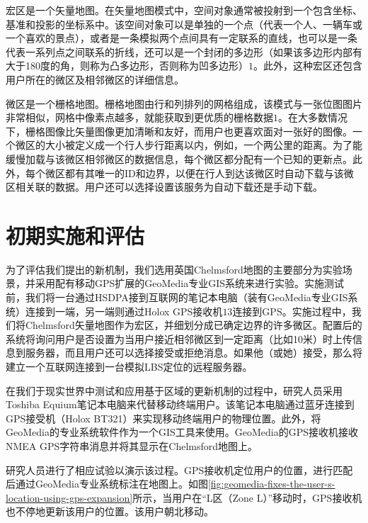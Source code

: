 \documentclass{article}
\begin{document}
\begin{CJK}{UTF8}{gbsn}
	宏区是一个矢量地图。在矢量地图模式中，空间对象通常被投射到一个包含坐标、基准和投影的坐标系中。该空间对象可以是单独的一个点（代表一个人、一辆车或一个喜欢的景点），或者是一条模拟两个点间具有一定联系的直线，也可以是一条代表一系列点之间联系的折线，还可以是一个封闭的多边形（如果该多边形内部有大于180度的角，则称为凸多边形，否则称为凹多边形）$1$。此外，这种宏区还包含用户所在的微区及相邻微区的详细信息。

	微区是一个栅格地图。栅格地图由行和列排列的网格组成，该模式与一张位图图片非常相似，网格中像素点越多，就能获取到更优质的栅格数据$1$。在大多数情况下，栅格图像比矢量图像更加清晰和友好，而用户也更喜欢面对一张好的图像。一个微区的大小被定义成一个行人步行距离以内，例如，一个两公里的距离。为了能缓慢加载与该微区相邻微区的数据信息，每个微区都分配有一个已知的更新点。此外，每个微区都有其唯一的ID和边界，以便在行人到达该微区时自动下载与该微区相关联的数据。用户还可以选择设置该服务为自动下载还是手动下载。

	\section{初期实施和评估}
	为了评估我们提出的新机制，我们选用英国Chelmsford地图的主要部分为实验场景，并采用配有移动GPS扩展的GeoMedia专业GIS系统来进行实验。实施测试前，我们将一台通过HSDPA接到互联网的笔记本电脑（装有GeoMedia专业GIS系统）连接到一端，另一端则通过Holox GPS接收机$13$连接到GPS。实施过程中，我们将Chelmsford矢量地图作为宏区，并细划分成已确定边界的许多微区。配置后的系统将询问用户是否设置为当用户接近相邻微区到一定距离（比如10米）时上传信息到服务器，而且用户还可以选择接受或拒绝消息。如果他（或她）接受，那么将建立一个互联网连接到一台模拟LBS定位的远程服务器。

	在我们于现实世界中测试和应用基于区域的更新机制的过程中，研究人员采用Toshiba Equium笔记本电脑来代替移动终端用户。该笔记本电脑通过蓝牙连接到GPS接受机（Holox BT321）来实现移动终端用户的物理位置。此外，将GeoMedia的专业系统软件作为一个GIS工具来使用。GeoMedia的GPS接收机接收NMEA GPS字符串消息并将其显示在Chelmsford地图上。

	研究人员进行了相应试验以演示该过程。GPS接收机定位用户的位置，进行匹配后通过GeoMedia专业系统标注在地图上。如图\ref{fig:geomedia-fixes-the-user-s-location-using-gps-expansion}所示，当用户在“L区（Zone L）”移动时，GPS接收机也不停地更新该用户的位置。该用户朝北移动。


\end{CJK}
\end{document}
